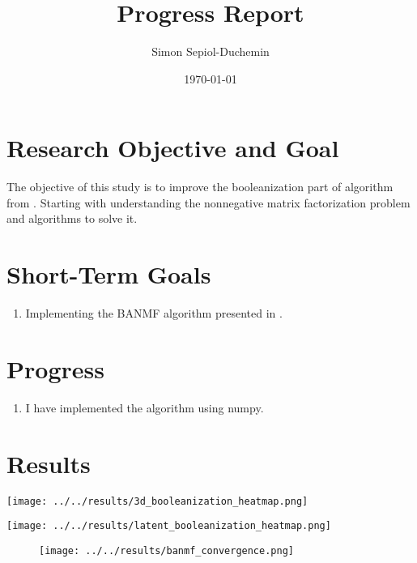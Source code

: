 \documentclass[a4paper,11pt]{article}
\title{Progress Report}
\author{Simon Sepiol-Duchemin}
\date{\today}
\begin{document}
%
\maketitle
\thispagestyle{empty}
%
\section{Research Objective and Goal}
The objective of this study is to improve the booleanization part of algorithm from \cite{9521203}. Starting with understanding the nonnegative matrix factorization problem and algorithms to solve it.
\section{Short-Term Goals}
\begin{enumerate}
\item Implementing the BANMF algorithm presented in \cite{9521203}. 
\end{enumerate}
\section{Progress}
\begin{enumerate}
\item I have implemented the algorithm using numpy. 
\end{enumerate}

\section{Results}

    \begin{minipage}{0.45\textwidth}
        \centering
        \texttt{[image: ../../results/3d\_booleanization\_heatmap.png]}
    \end{minipage}\hfill
    \begin{minipage}{0.45\textwidth}
        \centering
        \texttt{[image: ../../results/latent\_booleanization\_heatmap.png]}
    \end{minipage}
    
\begin{figure}[H]
    \begin{center}
        \texttt{[image: ../../results/banmf\_convergence.png]}  
    \end{center}
\end{figure}





\end{document}
